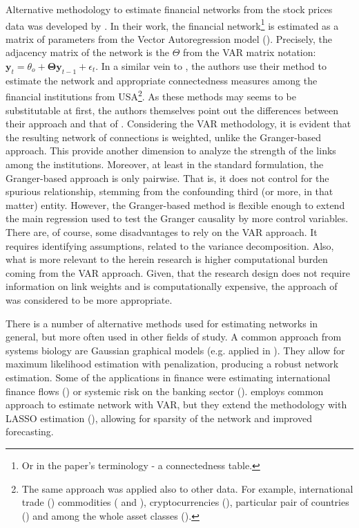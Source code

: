 \documentclass[12pt]{article}
\begin{document}
Alternative methodology to estimate financial networks from the stock prices data was developed by \cite{deibold14}. In their work, the financial network\footnote{Or in the paper's terminology - a connectedness table.} is estimated as a matrix of parameters from the Vector Autoregression model (\cite{sims80}). Precisely, the adjacency matrix of the network is the $\Theta$ from the VAR matrix notation: $\boldsymbol{y}_t = \theta_o + \boldsymbol{\Theta} \boldsymbol{y}_{t-1} + \epsilon_t$. In a similar vein to \cite{billio12}, the authors use their method to estimate the network and appropriate connectedness measures among the financial institutions from USA\footnote{The same approach was applied also to other data. For example, international trade (\cite{deibold23}) commodities (\cite{diebold17} and \cite{gong22}), cryptocurrencies (\cite{ji19}), particular pair of countries (\cite{dadej23})  and among the whole asset classes (\cite{bouri21}).}. As these methods may seems to be substitutable at first, the authors themselves point out the differences between their approach and that of \cite{billio12}. Considering the VAR methodology, it is evident that the resulting network of connections is weighted, unlike the Granger-based approach. This provide another dimension to analyze the strength of the links among the institutions. Moreover, at least in the standard formulation, the Granger-based approach is only pairwise. That is, it does not control for the spurious relationship, stemming from the confounding third (or more, in that matter) entity. However, the Granger-based method is flexible enough to extend the main regression used to test the Granger causality by more control variables. There are, of course, some disadvantages to rely on the VAR approach. It requires identifying assumptions, related to the variance decomposition. Also, what is more relevant to the herein research is higher computational burden coming from the VAR approach. Given, that the research design does not require information on link weights and is computationally expensive, the approach of \cite{billio12} was considered to be more appropriate.

There is a number of alternative methods used for estimating networks in general, but more often used in other fields of study. A common approach from systems biology are Gaussian graphical models (e.g. applied in \cite{friedman04}). They allow for maximum likelihood estimation with penalization, producing a robust network estimation. Some of the applications in finance were estimating international finance flows (\cite{giudici16}) or systemic risk on the banking sector (\cite{cerchiello16}). \cite{barigozzi19} employs common approach to estimate network with VAR, but they extend the methodology with LASSO estimation (\cite{breiman95}), allowing for sparsity of the network and improved forecasting.
\end{document}
